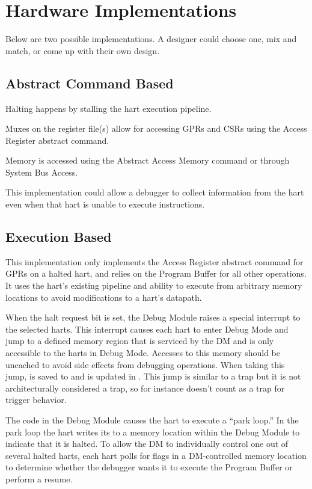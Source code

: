 \chapter{Hardware Implementations}
\label{sec:implementations}

Below are two possible implementations. A designer could choose one, mix and
match, or come up with their own design.

\section{Abstract Command Based}

Halting happens by stalling the hart execution pipeline.

Muxes on the register file(s) allow for accessing GPRs and CSRs
using the Access Register abstract command.

Memory is accessed using the Abstract Access Memory command or through System
Bus Access.

This implementation could allow a debugger to collect information from the hart
even when that hart is unable to execute instructions.

\section{Execution Based} \label{execution_based}

This implementation only implements the Access Register abstract command
for GPRs on a halted hart, and relies on the Program Buffer for all other
operations.
It uses the hart's existing pipeline
and ability to execute from arbitrary memory locations to avoid
modifications to a hart's datapath.

When the halt request bit is set, the Debug Module raises a special interrupt
to the selected harts. This interrupt causes each
hart to enter Debug Mode and jump to a defined
memory region that is serviced by the DM and is only accessible to the harts in Debug Mode.
Accesses to this memory should be uncached to avoid side effects from
debugging operations.
When taking this jump, \Rpc is saved to \RcsrDpc and \FcsrDcsrCause is updated
in \RcsrDcsr.  This jump is similar to a trap but it is not architecturally
considered a trap, so for instance doesn't count as a trap for trigger behavior.

The code in the Debug Module causes the hart to execute a ``park loop.''
In the park loop the hart writes its \Rmhartid to a
memory location within the Debug Module to indicate that it is halted.
To allow the DM to individually control one out of several
halted harts, each hart polls for flags in a DM-controlled memory location
to determine whether the debugger wants it to
execute the Program Buffer or perform a resume.

